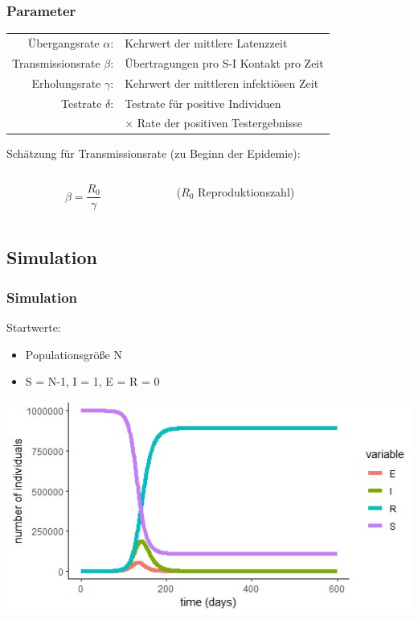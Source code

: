 \documentclass{beamer}
\begin{document}
\begin{frame}
\frametitle{Parameter}

	\begin{tabular}{rl}
		Übergangsrate $\alpha$:& Kehrwert der mittlere Latenzzeit \\
		Transmissionsrate $\beta$:& Übertragungen pro S-I Kontakt pro Zeit \\
		Erholungsrate $\gamma$:& Kehrwert der mittleren infektiösen Zeit\\
		Testrate $\delta$: &  Testrate für positive Individuen \\
						& $\times$ Rate der positiven Testergebnisse
	\end{tabular}

\vspace{1cm}
Schätzung für Transmissionsrate (zu Beginn der Epidemie): 
\begin{columns}
\begin{column}{0.2\textwidth}
\[\beta = \frac{R_0}{\gamma}\]
\end{column}
\begin{column}{0.5\textwidth}
($R_0$ Reproduktionszahl)
\end{column}
\end{columns}

\end{frame}


\subsection{ Simulation} 

\begin{frame}
	\frametitle{Simulation}
Startwerte:  \begin{itemize}
				\item Populationsgröße N
				\item S = N-1,  I = 1, E = R = 0
			\end{itemize}

\begin{center}
 \includegraphics[width = \textwidth]{epi}
\end{center}

\end{frame}
\end{document}
